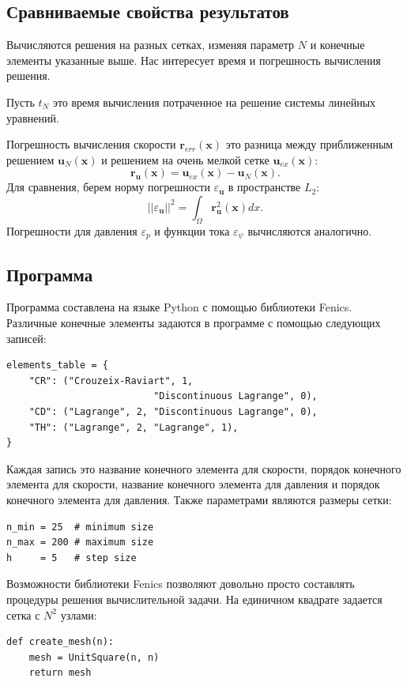 \documentclass[12pt]{article}
\begin{document}
\subsection{Сравниваемые свойства результатов}
Вычисляются решения на разных сетках, изменяя параметр $N$ и конечные элементы указанные выше.
Нас интересует время и погрешность вычисления решения.

Пусть $t_N$ это время вычисления потраченное на решение системы линейных уравнений.

Погрешность вычисления скорости $\bm r_{err}({\bm x})$ это разница между приближенным решением $\bm u_N({\bm x})$ и решением на очень мелкой сетке $\bm u_{ex}({\bm x})$:
\begin{equation}
{\bm r_{\bm u}}({\bm x}) = {\bm u_{ex}}({\bm x}) - {\bm u_N}({\bm x}).
\end{equation}
Для сравнения, берем норму погрешности $\varepsilon_{\bm u}$ в пространстве $L_2$:
\begin{equation}
||\varepsilon_{\bm u}||^2 = \int_{\Omega} {\bm r^2_{\bm u}}({\bm x}) dx.
\end{equation}
Погрешности для давления $\varepsilon_{p}$ и функции тока $\varepsilon_{\psi}$ вычисляются аналогично.

\subsection{Программа}
Программа составлена на языке Python с помощью библиотеки Fenics.
Различные конечные элементы задаются в программе с помощью следующих записей:
\begin{lstlisting}
elements_table = {
    "CR": ("Crouzeix-Raviart", 1, 
                          "Discontinuous Lagrange", 0),
    "CD": ("Lagrange", 2, "Discontinuous Lagrange", 0),    
    "TH": ("Lagrange", 2, "Lagrange", 1),
}
\end{lstlisting}
Каждая запись это название конечного элемента для скорости, порядок конечного элемента для скорости, название конечного элемента для давления и порядок конечного элемента для давления. Также параметрами являются размеры сетки:
\begin{lstlisting}
n_min = 25  # minimum size
n_max = 200 # maximum size
h     = 5   # step size
\end{lstlisting}

Возможности библиотеки Fenics позволяют довольно просто составлять процедуры решения вычислительной задачи. На единичном квадрате задается сетка с $N^2$ узлами:
\begin{lstlisting}
def create_mesh(n):
    mesh = UnitSquare(n, n)
    return mesh
\end{lstlisting}
\end{document}

